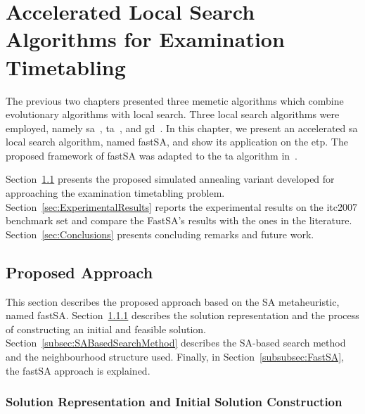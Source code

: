 \chapter{Accelerated Local Search Algorithms for Examination Timetabling} 
\label{ch:Chapter7}
\vfill \minitoc \newpage


The previous two chapters presented three memetic algorithms which combine evolutionary algorithms with local search. Three local search algorithms were employed, namely \gls{sa}~\citep{Kirkpatrick1983}, \gls{ta}~\citep{Dueck1990}, and \gls{gd}~\citep{Dueck1993}. In this chapter, we present an accelerated \gls{sa} local search algorithm, named \gls{fastSA}, and show its application on the \gls{etp}. The proposed framework of \gls{fastSA} was adapted to the \gls{ta} algorithm in~\cite{Leite2019a}.

Section~\ref{sec:ProposedApproach} presents the proposed simulated annealing variant developed for approaching the examination timetabling problem. Section~\ref{sec:ExperimentalResults} reports the experimental results on the \gls{itc2007} benchmark set and compare the FastSA's results with the ones in the literature. Section~\ref{sec:Conclusions} presents concluding remarks and future work.



%
%
\section{Proposed Approach}
\label{sec:ProposedApproach}

This section describes the proposed approach based on the SA metaheuristic, named \gls{fastSA}. Section~\ref{subsec:SolutionRepresentationAndConstructionOfInitialFeasibleTimetables} describes the solution representation and the process of constructing an initial and feasible solution.  Section~\ref{subsec:SABasedSearchMethod} describes the SA-based search method and the neighbourhood structure used. Finally, in Section~\ref{subsubsec:FastSA}, the \gls{fastSA} approach is explained.


\subsection{Solution Representation and Initial Solution Construction} 
\label{subsec:SolutionRepresentationAndConstructionOfInitialFeasibleTimetables}

